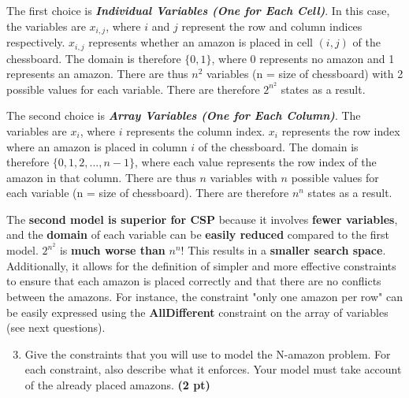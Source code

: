 \documentclass[11pt,a4paper]{report}
\begin{document}
\begin{answers}[6cm]

\footnotesize{
The first choice is \textbf{\textit{Individual Variables (One for Each Cell)}}. In this case, the variables are $x_{i,j}$, where $i$ and $j$ represent the row and column indices respectively. $x_{i,j}$ represents whether an amazon is placed in cell $(i,j)$ of the chessboard. The domain is therefore $\{0, 1\}$, where 0 represents no amazon and 1 represents an amazon. There are thus $n^2$ variables (n = size of chessboard) with 2 possible values for each variable. There are therefore $2^{n^2}$ states as a result.

The second choice is \textbf{\textit{Array Variables (One for Each Column)}}. The variables are $x_i$, where $i$ represents the column index. $x_i$ represents the row index where an amazon is placed in column $i$ of the chessboard. The domain is therefore $\{0, 1, 2, ..., n - 1\}$, where each value represents the row index of the amazon in that column. There are thus $n$ variables with $n$ possible values for each variable (n = size of chessboard). There are therefore $n^n$ states as a result.

The \textbf{second model is superior for CSP} because it involves \textbf{fewer variables}, and the \textbf{domain} of each variable can be \textbf{easily reduced} compared to the first model. $2^{n^2}$ is \textbf{much worse than} $n^n$! This results in a \textbf{smaller search space}. Additionally, it allows for the definition of simpler and more effective constraints to ensure that each amazon is placed correctly and that there are no conflicts between the amazons. For instance, the constraint "only one amazon per row" can be easily expressed using the \textbf{AllDifferent} constraint on the array of variables (see next questions).
}

\end{answers}

\begin{enumerate}
	\setcounter{enumi}{2}
	\item  Give the constraints that you will use to model the N-amazon problem.
	For each constraint, also describe what it enforces.
	Your model must take account of the already placed amazons. \textbf{(2 pt)}

\end{enumerate}
\end{document}
